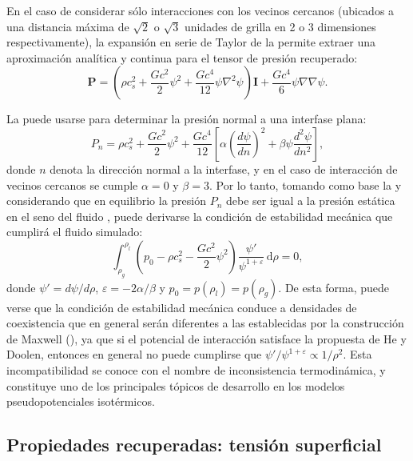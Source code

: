 En el caso de considerar s\'olo interacciones con los vecinos cercanos (ubicados a una distancia m\'axima de $\sqrt{2}$ o $\sqrt{3}$ unidades de grilla en 2 o 3 dimensiones respectivamente), la expansi\'on en serie de Taylor de la  permite extraer una aproximaci\'on anal\'itica y continua para el tensor de presi\'on recuperado:
\begin{equation}
	\bm{P} = \left( \rho c_s^2 + \dfrac{G c^2}{2} \psi^2 + \dfrac{G c^4}{12} \psi \nabla^2 \psi \right) \bm{I} + \dfrac{G c^4}{6} \psi \nabla \nabla \psi.
	\label{eq:ptens_shan_taylor}	
\end{equation}

La  puede usarse para determinar la presi\'on normal a una interfase plana:
\begin{equation}
	P_n = \rho c_s^2 + \dfrac{G c^2}{2} \psi^2 + \dfrac{G c^4}{12} \left[ \alpha \left( \dfrac{d\psi}{dn} \right)^2 + \beta \psi \dfrac{d^2 \psi}{dn^2} \right],
	\label{eq:ptens_shan_plane}	
\end{equation}
donde $n$ denota la direcci\'on normal a la interfase, y en el caso de interacci\'on de vecinos cercanos se cumple $\alpha = 0$ y $\beta = 3$. Por lo tanto, tomando como base la  y considerando que en equilibrio la presi\'on $P_n$ debe ser igual a la presi\'on est\'atica en el seno del fluido \cite{shan_pressure_2008}, puede derivarse la condici\'on de estabilidad mec\'anica que cumplir\'a el fluido simulado:
\begin{equation}
	\int_{\rho_g}^{\rho_l} \left( p_0 - \rho c_s^2 - \dfrac{Gc^2}{2} \psi^2 \right) \dfrac{\psi'}{\psi^{1+\varepsilon}} \, \mbox{d}\rho = 0,
	\label{eq:thermo_inc}
\end{equation}
donde $\psi' = d\psi / d\rho$, $\varepsilon=-2\alpha/\beta$ y $p_0=p(\rho_l)=p(\rho_g)$. De esta forma, puede verse que la condici\'on de estabilidad mec\'anica conduce a densidades de coexistencia que en general ser\'an diferentes a las establecidas por la construcci\'on de Maxwell (), ya que si el potencial de interacci\'on satisface la propuesta de He y Doolen, entonces en general no puede cumplirse que $\psi' / \psi^{1+\varepsilon} \propto 1/\rho^2$. Esta incompatibilidad se conoce con el nombre de inconsistencia termodin\'amica, y constituye uno de los principales t\'opicos de desarrollo en los modelos pseudopotenciales isot\'ermicos.



\subsection{Propiedades recuperadas: tensi\'on superficial}

